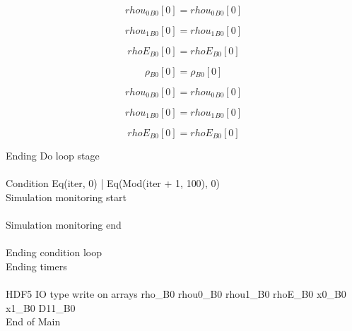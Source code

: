 \documentclass{article}
\begin{document}
\begin{dmath}{rhou_{0}{_{B0}}}[{0}] = {rhou_{0}{_{B0}}}[{0}]\end{dmath}

\begin{dmath}{rhou_{1}{_{B0}}}[{0}] = {rhou_{1}{_{B0}}}[{0}]\end{dmath}

\begin{dmath}{rhoE{_{B0}}}[{0}] = {rhoE{_{B0}}}[{0}]\end{dmath}

\begin{dmath}{\rho{_{B0}}}[{0}] = {\rho{_{B0}}}[{0}]\end{dmath}

\begin{dmath}{rhou_{0}{_{B0}}}[{0}] = {rhou_{0}{_{B0}}}[{0}]\end{dmath}

\begin{dmath}{rhou_{1}{_{B0}}}[{0}] = {rhou_{1}{_{B0}}}[{0}]\end{dmath}

\begin{dmath}{rhoE{_{B0}}}[{0}] = {rhoE{_{B0}}}[{0}]\end{dmath}

\noindent Ending Do loop stage\\
\\\noindent Condition Eq(iter, 0) | Eq(Mod(iter + 1, 100), 0)\\\noindent Simulation monitoring start\\
\\\noindent Simulation monitoring end\\
\\\noindent Ending condition loop %
\\\noindent Ending timers\\
\\\noindent HDF5 IO type write on arrays rho_B0 rhou0_B0 rhou1_B0 rhoE_B0 x0_B0 x1_B0 D11_B0\\\noindent End of Main\\
\end{document}
